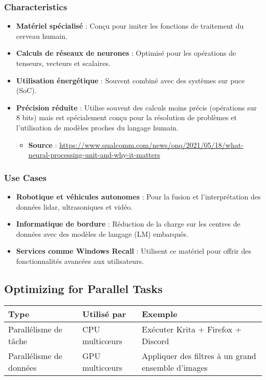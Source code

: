 \documentclass[10pt,a4paper]{article}
\begin{document}
\subsubsection*{Characteristics}
\begin{itemize}
    \item \textbf{Matériel spécialisé} : Conçu pour imiter les fonctions de traitement du cerveau humain.
    \item \textbf{Calculs de réseaux de neurones} : Optimisé pour les opérations de tenseurs, vecteurs et scalaires.
    \item \textbf{Utilisation énergétique} : Souvent combiné avec des systèmes sur puce (SoC).
    \item \textbf{Précision réduite} : Utilise souvent des calculs moins précis (opérations sur 8 bits) mais est spécialement conçu pour la résolution de problèmes et l'utilisation de modèles proches du langage humain.
    \begin{itemize}
        \item \textbf{Source} : \url{https://www.qualcomm.com/news/onq/2021/05/18/what-neural-processing-unit-and-why-it-matters}
    \end{itemize}
\end{itemize}

\subsubsection*{Use Cases}
\begin{itemize}
    \item \textbf{Robotique et véhicules autonomes} : Pour la fusion et l'interprétation des données lidar, ultrasoniques et vidéo.
    \item \textbf{Informatique de bordure} : Réduction de la charge sur les centres de données avec des modèles de langage (LM) embarqués.
    \item \textbf{Services comme Windows Recall} : Utilisent ce matériel pour offrir des fonctionnalités avancées aux utilisateurs.
\end{itemize}

\subsection*{Optimizing for Parallel Tasks}

\begin{center}
\begin{tabular}{|l|l|l|}
\hline
\textbf{Type} & \textbf{Utilisé par} & \textbf{Exemple} \\
\hline
Parallélisme de tâche & CPU multicœurs & Exécuter Krita + Firefox + Discord \\
\hline
Parallélisme de données & GPU multicœurs & Appliquer des filtres à un grand ensemble d'images \\
\hline
\end{tabular}
\end{center}
\end{document}
